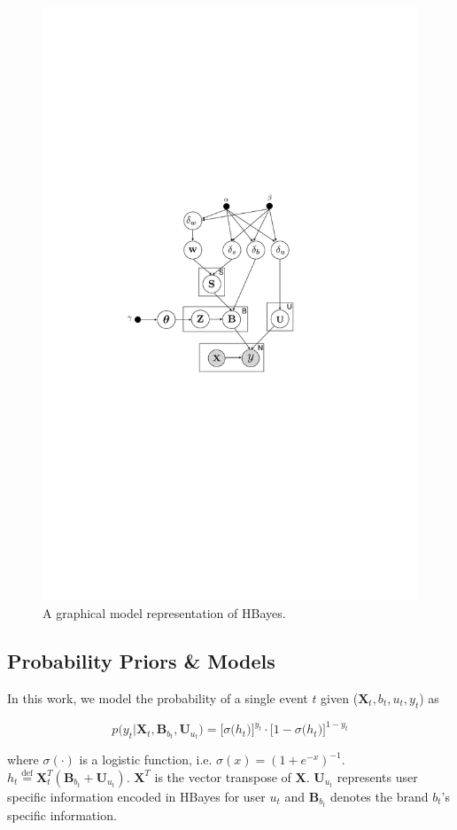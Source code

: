 \begin{figure}[htb]
\includegraphics[width=0.8\linewidth]{fig/model}
\caption{A graphical model representation of HBayes.}
\label{fig:model}
\end{figure}

\subsection{Probability Priors \& Models}

In this work, we model the probability of a single event $t$ given ($\mathbf{X}_t, b_t, u_t, y_t$) as 

\begin{equation}
p\big(y_t|\bm{X}_t,\bm{B}_{b_t},\bm{U}_{u_t} \big)= \Big[\sigma\big(h_t\big)\Big]^{y_t} \cdot \Big[1-\sigma\big(h_t\big)\Big]^{1-y_t}
\end{equation}

\noindent where $\sigma(\cdot)$ is a logistic function, i.e. $\sigma(x)=(1+e^{-x})^{-1}$. $h_{t}\overset{\mathrm{def}}=\bm{X}_t^T(\bm{B}_{b_t}+\bm{U}_{u_t})$. $\mathbf{X}^T$ is the vector transpose of $\mathbf{X}$. $\bm{U}_{u_t}$ represents user specific information encoded in HBayes for user $u_t$ and $\bm{B}_{b_t}$ denotes the brand $b_t$'s specific information.

